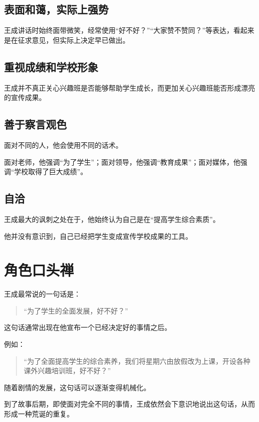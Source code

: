 \documentclass[12pt,a4paper]{ctexart}
\begin{document}
	\subsection{表面和蔼，实际上强势}
	
	王成讲话时始终面带微笑，经常使用“好不好？”“大家赞不赞同？”等表达，看起来是在征求意见，但实际上决定早已做出。
	
	\subsection{重视成绩和学校形象}
	
	王成并不真正关心兴趣班是否能够帮助学生成长，而更加关心兴趣班能否形成漂亮的宣传成果。
	
	\subsection{善于察言观色}
	
	面对不同的人，他会使用不同的话术。
	
	面对老师，他强调“为了学生”；面对领导，他强调“教育成果”；面对媒体，他强调“学校取得了巨大成绩”。
	
	\subsection{自洽}
	
	王成最大的讽刺之处在于，他始终认为自己是在“提高学生综合素质”。
	
	他并没有意识到，自己已经把学生变成宣传学校成果的工具。
	
	\section{角色口头禅}
	
	王成最常说的一句话是：
	
	\begin{quote}
		“为了学生的全面发展，好不好？”
	\end{quote}
	
	这句话通常出现在他宣布一个已经决定好的事情之后。
	
	例如：
	
	\begin{quote}
		“为了全面提高学生的综合素养，我们将星期六由放假改为上课，开设各种课外兴趣培训班，好不好？”
	\end{quote}
	
	随着剧情的发展，这句话可以逐渐变得机械化。
	
	到了故事后期，即使面对完全不同的事情，王成依然会下意识地说出这句话，从而形成一种荒诞的重复。
	
\end{document}
